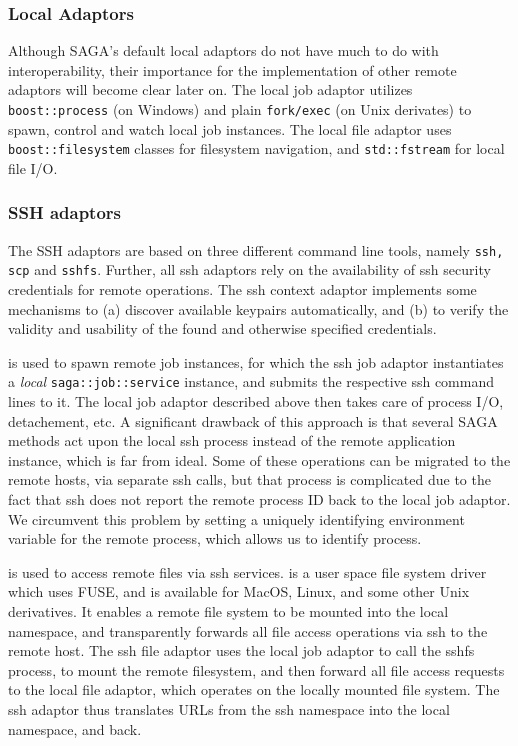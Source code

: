 \documentclass[conference,final]{IEEEtran}
\newcommand{\T}[1]{\texttt{#1}}
\newcommand{\I}[1]{\textit{#1}}
\newcommand{\ssh}[1]{\texttt{ssh}}
\newcommand{\sshfs}[1]{\texttt{sshfs}}
\begin{document}


\subsubsection{Local Adaptors}
Although SAGA's default local adaptors do not have much to do with
interoperability, their importance for the implementation of other
remote adaptors will become clear later on.  The local job adaptor
utilizes \T{boost::process} (on Windows) and plain \T{fork/exec} (on
Unix derivates) to spawn, control and watch local job instances.  The
local file adaptor uses \T{boost::filesystem} classes for filesystem
navigation, and \T{std::fstream} for local file I/O. %

\subsubsection{SSH adaptors}
The SSH adaptors are based on three different command line tools,
namely {\texttt{ssh, scp}} and {\texttt{sshfs}}.  Further, all ssh
adaptors rely on the availability of ssh security credentials for
remote operations.  The ssh context adaptor implements some mechanisms
to (a) discover available keypairs automatically, and (b) to verify
the validity and usability of the found and otherwise specified
credentials.
  
{\texttt{\ssh}} is used to spawn remote job instances, for which the
ssh job adaptor instantiates a \I{local} \T{saga::job::service}
instance, and submits the respective ssh command lines to it.  The
local job adaptor described above then takes care of process I/O,
detachement, etc.  A significant drawback of this approach is that
several SAGA methods act upon the local ssh process instead of the
remote application instance, which is far from ideal. Some of these
operations can be migrated to the remote hosts, via separate ssh
calls, but that process is complicated due to the fact that ssh does
not report the remote process ID back to the local job adaptor.  We
circumvent this problem by setting a uniquely identifying environment
variable for the remote process, which allows us to identify process.

{\texttt{\sshfs}} is used to access remote files via ssh services.
{\texttt{\sshfs}} is a user space file system driver which uses FUSE,
and is available for MacOS, Linux, and some other Unix derivatives.
It enables a remote file system to be mounted into the local
namespace, and transparently forwards all file access operations via
ssh to the remote host.  The ssh file adaptor uses the local job
adaptor to call the sshfs process, to mount the remote filesystem, and
then forward all file access requests to the local file adaptor, which
operates on the locally mounted file system.  The ssh adaptor thus
translates URLs from the ssh namespace into the local namespace, and
back.
\end{document}
